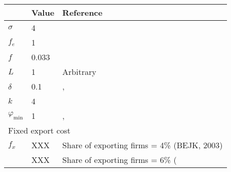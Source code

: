 \begin{tabular}{lll}
& Value & Reference\\
\hline
$\sigma$ & 4 & \cite{Irrazabal_2015}\\
$f_e$ & 1 & \cite{ghironi}\\
$f$ & 0.033 & \cite{ghironi} \\
$L$ & 1 & Arbitrary\\
$\delta$ & 0.1 & \cite{ghironi}, \cite{Irrazabal_2015}\\
$k$ & 4 \\
$\varphi_{\text{min}}$ & 1 & \cite{ghironi}, \cite{Irrazabal_2015}\\ \hline
\multicolumn{3}{l}{Fixed export cost } \\
$f_x $ & XXX & Share of exporting firms = 4\% (BEJK, 2003) \\
& XXX& Share of exporting firms = 6\% (\cite{Lincoln_McCallum2018}
\hline
\end{tabular} 